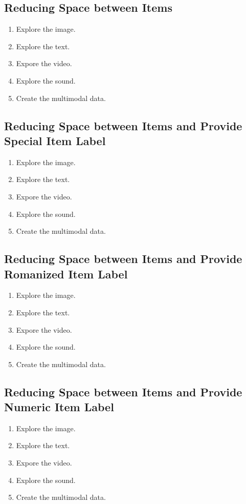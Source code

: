 \documentclass[11pt]{article}
\begin{document}
\subsection{Reducing Space between Items}
\begin{enumerate}[nosep]
\item Explore the image.
\item Explore the text.
\item Expore the video.
\item Explore the sound.
\item Create the multimodal data.
\end{enumerate}

\subsection{Reducing Space between Items and Provide Special Item Label}
\begin{enumerate}[nosep, label=*]
\item Explore the image.
\item Explore the text.
\item Expore the video.
\item Explore the sound.
\item Create the multimodal data.
\end{enumerate}

\subsection{Reducing Space between Items and Provide Romanized Item Label}
\begin{enumerate}[nosep, label=\roman*]
\item Explore the image.
\item Explore the text.
\item Expore the video.
\item Explore the sound.
\item Create the multimodal data.
\end{enumerate}


\subsection{Reducing Space between Items and Provide Numeric Item Label}
\begin{enumerate}[nosep, label=\arabic*]
\item Explore the image.
\item Explore the text.
\item Expore the video.
\item Explore the sound.
\item Create the multimodal data.
\end{enumerate}
\end{document}
